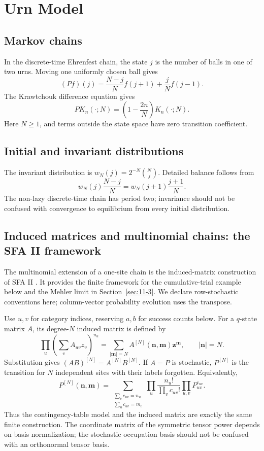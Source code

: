 \chapter{Urn Model}
\label{ch:3}
\section{Markov chains}
\label{sec:3-1}
In the discrete-time Ehrenfest chain, the state $j$ is the number of balls in one of two urns. Moving one uniformly chosen ball gives
\[
(Pf)(j)=\frac{N-j}{N}f(j+1)+\frac jN f(j-1).
\]
The Krawtchouk difference equation gives
\[
P K_n(\cdot;N)=\left(1-\frac{2n}{N}\right)K_n(\cdot;N).
\]
Here $N\geq1$, and terms outside the state space have zero transition coefficient.

\section{Initial and invariant distributions}
\label{sec:3-2}
The invariant distribution is $w_N(j)=2^{-N}\binom Nj$. Detailed balance follows from
\[
w_N(j)\frac{N-j}{N}=w_N(j+1)\frac{j+1}{N}.
\]
The non-lazy discrete-time chain has period two; invariance should not be confused with convergence to equilibrium from every initial distribution.



\section{Induced matrices and multinomial chains: the SFA II framework}
\label{sec:ency-sfa-ii}
The multinomial extension of a one-site chain is the induced-matrix
construction of SFA II \cite{FeinsilverSFAII2023}. It provides the finite
framework for the cumulative-trial example below and the Mehler limit
in Section~\ref{sec:11-3}. We declare row-stochastic conventions here;
column-vector probability evolution uses the transpose.

Use $u,v$ for category indices, reserving $a,b$ for success counts below.
For a $q$-state matrix $A$, its degree-$N$ induced matrix is defined by
\begin{equation}\label{eq:ency-induced-definition}
\prod_u\left(\sum_vA_{uv}z_v\right)^{n_u}
=\sum_{|\mathbf m|=N}A^{[N]}(\mathbf n,\mathbf m)\mathbf z^{\mathbf m},
\qquad |\mathbf n|=N.
\end{equation}
Substitution gives $(AB)^{[N]}=A^{[N]}B^{[N]}$. If $A=P$ is stochastic,
$P^{[N]}$ is the transition for $N$ independent sites with their labels
forgotten. Equivalently,
\[
P^{[N]}(\mathbf n,\mathbf m)
=\sum_{\substack{\sum_v c_{uv}=n_u\\\sum_u c_{uv}=m_v}}
\prod_u\frac{n_u!}{\prod_v c_{uv}!}\prod_{u,v}P_{uv}^{c_{uv}}.
\]
Thus the contingency-table model and the induced matrix are exactly
the same finite construction. The coordinate matrix of the symmetric
tensor power depends on basis normalization; the stochastic occupation
basis should not be confused with an orthonormal tensor basis.


